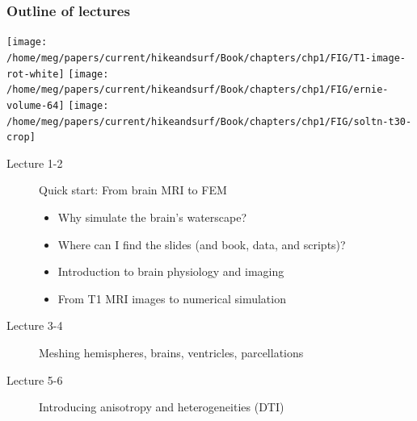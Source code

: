 \documentclass[mathserif, aspectratio=169]{beamer}
\begin{document}
\begin{frame}
  \frametitle{Outline of lectures}
  \begin{center}
  \texttt{[image: /home/meg/papers/current/hikeandsurf/Book/chapters/chp1/FIG/T1-image-rot-white]}
  \texttt{[image: /home/meg/papers/current/hikeandsurf/Book/chapters/chp1/FIG/ernie-volume-64]}
  \texttt{[image: /home/meg/papers/current/hikeandsurf/Book/chapters/chp1/FIG/soltn-t30-crop]}
  \end{center}
  \begin{description}
    \item[Lecture 1-2] Quick start: From brain MRI to FEM
      \begin{itemize}
      \item
        Why simulate the brain's waterscape?
      \item
        Where can I find the slides (and book, data, and scripts)?
      \item
        Introduction to brain physiology and imaging
      \item
        From T1 MRI images to numerical simulation
      \end{itemize}
    \item[Lecture 3-4] Meshing hemispheres, brains, ventricles, parcellations
    \item[Lecture 5-6] Introducing anisotropy and heterogeneities (DTI)
  \end{description}
\end{frame}
\end{document}
